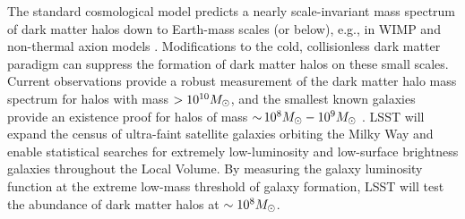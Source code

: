 \documentclass[12pt]{article}
\begin{document}
The standard cosmological model predicts a nearly scale-invariant mass spectrum of dark matter halos down to Earth-mass scales (or below), e.g., in WIMP and non-thermal axion models \citep{Green:2003un,2005Natur.433..389D,1412.5930}.
Modifications to the cold, collisionless dark matter paradigm can suppress the formation of dark matter halos on these small scales.
Current observations provide a robust measurement of the dark matter halo mass spectrum for halos with mass $> 10^{10}M_\odot$, and the smallest known galaxies provide an existence proof for halos of mass $ {\sim}\, 10^8 M_\odot - 10^9 M_\odot$ \citep{2017MNRAS.467.2019R,behroozi2018,Jethwa:2018,Kim:2017iwr,Nadler:2018,1807.07093}. 
LSST will expand the census of ultra-faint satellite galaxies orbiting the Milky Way and enable statistical searches for extremely low-luminosity and low-surface brightness galaxies throughout the Local Volume.
By measuring the galaxy luminosity function at the extreme low-mass threshold of galaxy formation, LSST will test the abundance of dark matter halos at $\sim10^8 M_\odot$.
\end{document}
